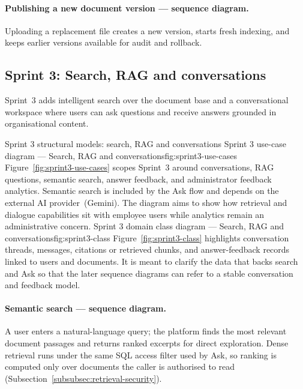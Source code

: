 \paragraph{Publishing a new document version --- sequence diagram.}
Uploading a replacement file creates a new version, starts fresh indexing, and
keeps earlier versions available for audit and rollback.

\subsection{Sprint 3: Search, RAG and conversations}\label{subsec:sprint3-design}

Sprint~3 adds intelligent search over the document base and a conversational
workspace where users can ask questions and receive answers grounded in
organisational content.

%
  {Sprint 3 structural models: search, RAG and conversations}%
  {Sprint 3 use-case diagram — Search, RAG and conversations}{fig:sprint3-use-cases}%
  {Figure~\ref{fig:sprint3-use-cases} scopes Sprint~3 around conversations,
  RAG questions, semantic search, answer feedback, and administrator feedback
  analytics. Semantic search is included by the Ask flow and depends on the
  external AI provider~(Gemini). The diagram aims to show how retrieval and
  dialogue capabilities sit with employee users while analytics remain an
  administrative concern.}%
  {Sprint 3 domain class diagram — Search, RAG and conversations}{fig:sprint3-class}%
  {Figure~\ref{fig:sprint3-class} highlights conversation threads, messages,
  citations or retrieved chunks, and answer-feedback records linked to users and
  documents. It is meant to clarify the data that backs search and Ask so that
  the later sequence diagrams can refer to a stable conversation and feedback
  model.}%



\paragraph{Semantic search --- sequence diagram.}
A user enters a natural-language query; the platform finds the most relevant
document passages and returns ranked excerpts for direct exploration. Dense
retrieval runs under the same SQL access filter used by Ask, so ranking is
computed only over documents the caller is authorised to read
(Subsection~\ref{subsubsec:retrieval-security}).

